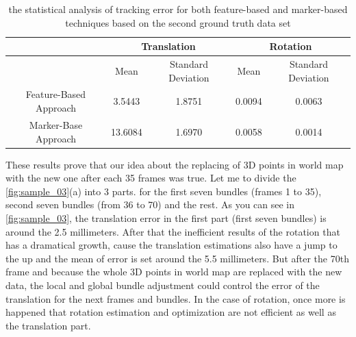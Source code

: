 \begin{table}[H]
\centering
  \begin{tabular}{| c || c | c | c | c |}
      \hline
      & \multicolumn{2}{c|}{Translation} & \multicolumn{2}{c|}{Rotation} \\ \hline
       & Mean & Standard Deviation & Mean & Standard Deviation \\ \hline
      Feature-Based Approach & 3.5443 & 1.8751 & 0.0094 & 0.0063 \\ \hline
      Marker-Base Approach & 13.6084 & 1.6970 & 0.0058 & 0.0014 \\ \hline
  \end{tabular}
  \caption{the statistical analysis of tracking error for both feature-based and marker-based techniques based on the second ground truth data set} \label{tab:sample_03}
\end{table}

These results prove that our idea about the replacing of 3D points in world map with the new one after each 35 frames was true. Let me to divide the \autoref{fig:sample_03}(a) into 3 parts. for the first seven bundles (frames 1 to 35), second seven bundles (from 36 to 70) and the rest. As you can see in \autoref{fig:sample_03}, the translation error in the first part (first seven bundles) is around the 2.5 millimeters. After that the inefficient results of the rotation that has a dramatical growth, cause the translation estimations also have a jump to the up and the mean of error is set around the 5.5 millimeters. But after the 70th frame and because the whole 3D points in world map are replaced with the new data, the local and global bundle adjustment could control the error of the translation for the next frames and bundles. In the case of rotation, once more is happened that rotation estimation and optimization are not efficient as well as the translation part.


